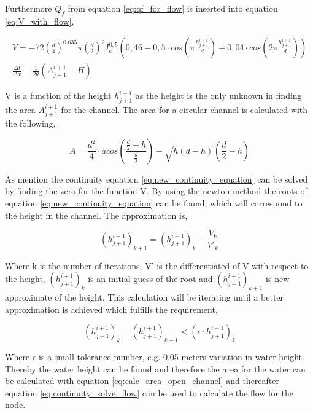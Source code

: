 Furthermore $Q_f$ from equation \ref{eq:qf_for_flow} is inserted into equation \ref{eq:V_with_flow}, 

\begin{multline}\label{eq:new_continuity_equation}
	V = -72\left(\frac{d}{4}\right)^{0.635}\pi\left(\frac{d}{2}\right)^2I_e^{0,5} \left(0,46-0,5\cdot cos\left(\pi \frac{h_{j+1}^{i+1}}{d}\right)+ 0,04\cdot cos\left(2\pi\frac{h_{j+1}^{i+1}}{d}\right)\right)\\ \frac{\Delta t}{\Delta x}-\frac{1}{2\theta}\left(A_{j+1}^{i+1}-H\right)
\end{multline}

V is a function of the height $h_{j+1}^{i+1}$ as the height is the only unknown in finding the area $A_{j+1}^{i+1}$ for the channel. The area for a circular channel is calculated with the following,

\begin{equation}\label{eq:calc_area_open_channel}
	A = \frac {d^2}{4} \cdot acos \left(\frac{\frac{d}{2}-h}{\frac{d}{2}}\right)-\sqrt{h (d-h)} \left(\frac{d}{2}-h\right)
\end{equation}

As mention the continuity equation \ref{eq:new_continuity_equation} can be solved by finding the zero for the function V. By using the newton method the roots of equation \ref{eq:new_continuity_equation} can be found, which will correspond to the height in the channel. The approximation is,

\begin{equation}
	 (h_{j+1}^{i+1})_{k+1} =(h_{j+1}^{i+1})_{k} - \frac{V_k}{V'_k} 
\end{equation}  

Where k is the number of iterations, V' is the differentiated of V with respect to the height, $(h_{j+1}^{i+1})_{k}$ is an initial guess of the root and $(h_{j+1}^{i+1})_{k+1}$ is new approximate of the height. This calculation will be iterating until a better approximation is achieved which fulfills the requirement,

\begin{equation}
	\left(h_{j+1}^{i+1}\right)_{k}-(h_{j+1}^{i+1})_{k-1} < (\epsilon \cdot h_{j+1}^{i+1})_{k}
\end{equation}

Where $\epsilon$ is a small tolerance number, e.g. 0.05 meters variation in water height. Thereby the water height can be found and therefore the area for the water can be calculated with equation \ref{eq:calc_area_open_channel}  and thereafter equation \ref{eq:continuity_solve_flow} can be used to calculate the flow for the node.  

